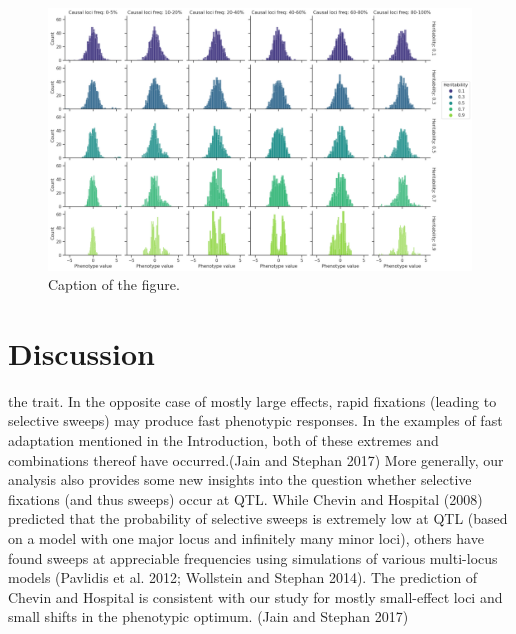 \documentclass{article}
\begin{document}
\begin{figure}[h]
    \centering
    \includegraphics[width=1\textwidth]{figures/phenotypes_initial_onlymonogenic (1).png}
    \caption{Caption of the figure.}
    \label{fig:phenotypes_initial_mono}
\end{figure}

\section{Discussion}

the trait. In the opposite case of mostly large effects, rapid fixations (leading to selective sweeps) may produce fast phenotypic responses. In the examples of fast adaptation mentioned in the Introduction, both of these extremes and combinations thereof have occurred.(Jain and Stephan 2017)
More generally, our analysis also provides some new insights into the question whether selective fixations (and thus sweeps) occur at QTL. While Chevin and Hospital (2008) predicted that the probability of selective sweeps is extremely low at QTL (based on a model with one major locus and infinitely many minor loci), others have found sweeps at appreciable frequencies using simulations of various multi-locus models (Pavlidis et al. 2012; Wollstein and Stephan 2014). The prediction of Chevin and Hospital is consistent with our study for mostly small-effect loci and small shifts in the phenotypic optimum. (Jain and Stephan 2017)



\end{document}
